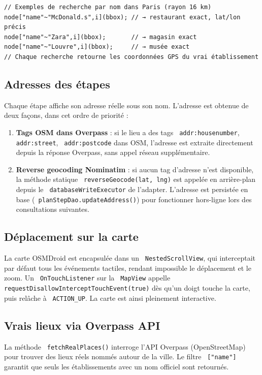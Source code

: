\documentclass[a4paper,12pt,openany]{report}
\newcommand{\ic}[1]{\texttt{\small\colorbox{lightbg}{\color{navy!90} #1}}}
\begin{document}
\begin{lstlisting}
// Exemples de recherche par nom dans Paris (rayon 16 km)
node["name"~"McDonald.s",i](bbox); // → restaurant exact, lat/lon précis
node["name"~"Zara",i](bbox);       // → magasin exact
node["name"~"Louvre",i](bbox);     // → musée exact
// Chaque recherche retourne les coordonnées GPS du vrai établissement
\end{lstlisting}

\subsection{Adresses des étapes}

Chaque étape affiche son adresse réelle sous son nom. L'adresse est obtenue
de deux façons, dans cet ordre de priorité :

\begin{enumerate}
  \item \textbf{Tags OSM dans Overpass} : si le lieu a des tags \ic{addr:housenumber},
    \ic{addr:street}, \ic{addr:postcode} dans OSM, l'adresse est extraite
    directement depuis la réponse Overpass, sans appel réseau supplémentaire.
  \item \textbf{Reverse geocoding Nominatim} : si aucun tag d'adresse n'est
    disponible, la méthode statique \ic{reverseGeocode(lat, lng)} est appelée
    en arrière-plan depuis le \ic{databaseWriteExecutor} de l'adapter.
    L'adresse est persistée en base (\ic{planStepDao.updateAddress()}) pour
    fonctionner hors-ligne lors des consultations suivantes.
\end{enumerate}

\subsection{Déplacement sur la carte}

La carte OSMDroid est encapsulée dans un \ic{NestedScrollView}, qui interceptait
par défaut tous les événements tactiles, rendant impossible le déplacement
et le zoom. Un \ic{OnTouchListener} sur la \ic{MapView} appelle
\ic{requestDisallowInterceptTouchEvent(true)} dès qu'un doigt touche la carte,
puis relâche à \ic{ACTION\_UP}. La carte est ainsi pleinement interactive.

\subsection{Vrais lieux via Overpass API}

La méthode \ic{fetchRealPlaces()} interroge l'API Overpass (OpenStreetMap)
pour trouver des lieux réels nommés autour de la ville. Le filtre \ic{["name"]}
garantit que seuls les établissements avec un nom officiel sont retournés.
\end{document}
